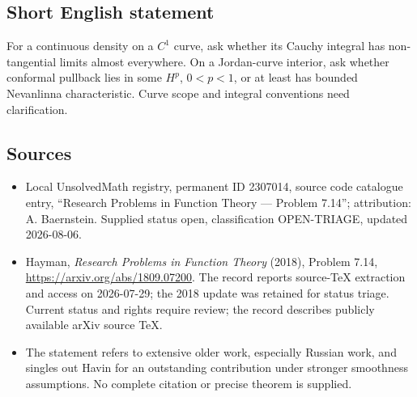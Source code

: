\documentclass[11pt]{article}
\begin{document}
\subsection{Short English statement}
For a continuous density on a $C^1$ curve, ask whether its Cauchy integral has non-tangential limits almost everywhere. On a Jordan-curve interior, ask whether conformal pullback lies in some $H^p$, $0<p<1$, or at least has bounded Nevanlinna characteristic. Curve scope and integral conventions need clarification.
\subsection{Sources}
\begin{itemize}
\item Local UnsolvedMath registry, permanent ID 2307014, source code catalogue entry, ``Research Problems in Function Theory --- Problem 7.14''; attribution: A. Baernstein. Supplied status open, classification OPEN-TRIAGE, updated 2026-08-06.
\item Hayman, \emph{Research Problems in Function Theory} (2018), Problem 7.14, \url{https://arxiv.org/abs/1809.07200}. The record reports source-TeX extraction and access on 2026-07-29; the 2018 update was retained for status triage. Current status and rights require review; the record describes publicly available arXiv source TeX.
\item The statement refers to extensive older work, especially Russian work, and singles out Havin for an outstanding contribution under stronger smoothness assumptions. No complete citation or precise theorem is supplied.
\end{itemize}
\end{document}
